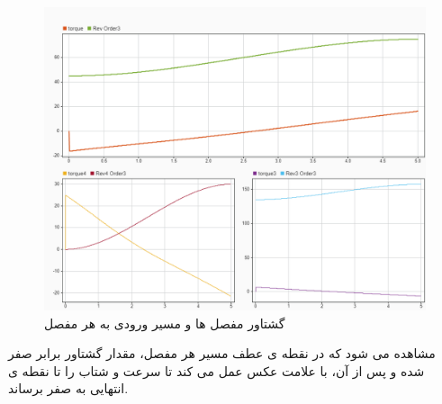 \begin{figure}[H]
	\centering
	\includegraphics[width=1\linewidth]{../img/20}
	\caption{گشتاور مفصل ها و مسیر ورودی به هر  مفصل}
	\label{fig:20}
\end{figure}
مشاهده می شود که در نقطه ی عطف مسیر هر مفصل، مقدار گشتاور برابر صفر شده و پس از آن، با علامت عکس عمل می کند تا سرعت و شتاب را تا نقطه ی انتهایی به صفر برساند.

